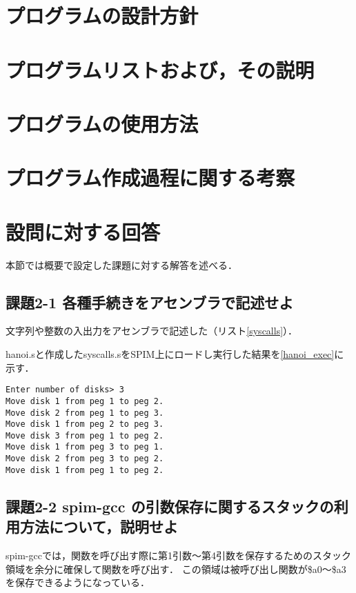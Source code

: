 \documentclass[11pt]{jarticle}
\begin{document}
\section{プログラムの設計方針}

\section{プログラムリストおよび，その説明}

\section{プログラムの使用方法}

\section{プログラム作成過程に関する考察}

\section{設問に対する回答}

本節では概要で設定した課題に対する解答を述べる．

\subsection{課題2-1 各種手続きをアセンブラで記述せよ}

文字列や整数の入出力をアセンブラで記述した（リスト\ref{syscalls}）．

hanoi.sと作成したsyscalls.sをSPIM上にロードし実行した結果を\ref{hanoi_exec}に示す．

\begin{lstlisting}[caption=実行結果,label=hanoi_exec]
Enter number of disks> 3
Move disk 1 from peg 1 to peg 2.
Move disk 2 from peg 1 to peg 3.
Move disk 1 from peg 2 to peg 3.
Move disk 3 from peg 1 to peg 2.
Move disk 1 from peg 3 to peg 1.
Move disk 2 from peg 3 to peg 2.
Move disk 1 from peg 1 to peg 2.
\end{lstlisting}

\subsection{課題2-2 spim-gcc の引数保存に関するスタックの利用方法について，説明せよ}

spim-gccでは，関数を呼び出す際に第1引数～第4引数を保存するためのスタック領域を余分に確保して関数を呼び出す．
この領域は被呼び出し関数が\$a0～\$a3を保存できるようになっている．
\end{document}
